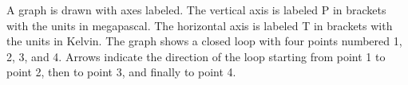 A graph is drawn with axes labeled. The vertical axis is labeled P in brackets with the units in megapascal. The horizontal axis is labeled T in brackets with the units in Kelvin. The graph shows a closed loop with four points numbered 1, 2, 3, and 4. Arrows indicate the direction of the loop starting from point 1 to point 2, then to point 3, and finally to point 4.